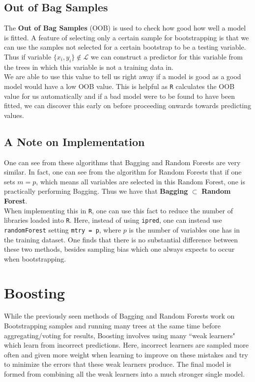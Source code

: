 \documentclass[11pt,a4paper]{report}
\begin{document}
\subsection{Out of Bag Samples}
The \textbf{Out of Bag Samples} (OOB) is used to check how good how well a model is fitted. 
A feature of selecting only a certain sample for bootstrapping is that we can use the samples not selected for a certain bootstrap to be a testing variable. 
Thus if variable $\{x_i, y_i\} \notin \mathcal{L}$ we can construct a predictor for this variable from the trees in which this variable is not a training data in.
\medskip\\
We are able to use this value to tell us right away if a model is good as a good model would have a low OOB value. 
This is helpful as {\color{blue} \texttt{R}} calculates the OOB value for us automatically and if a bad model were to be found to have been fitted, we can discover this early on before proceeding onwards towards predicting values.

\subsection{A Note on Implementation}
One can see from these algorithms that Bagging and Random Forests are very similar. 
In fact, one can see from the algorithm for Random Forests that if one sets $m = p$, which means all variables are selected in this Random Forest, one is practically performing Bagging.
Thus we have that \textbf{Bagging} $\subset$ \textbf{Random Forest}.
\medskip\\
When implementing this in {\color{blue} \texttt{R}}, one can use this fact to reduce the number of libraries loaded into {\color{blue} \texttt{R}}.
Here, instead of using {\color{blue} \texttt{ipred}}, one can instead use {\color{blue} \texttt{randomForest}} setting \texttt{mtry = p}, where $p$ is the number of variables one has in the training dataset.
One finds that there is no substantial difference between these two methods, besides sampling bias which one always expects to occur when bootstrapping.



\section{Boosting}
While the previously seen methods of Bagging and Random Forests work on Bootstrapping samples and running many trees at the same time before aggregating/voting for results, Boosting involves using many ``weak learners" which learn from incorrect predictions. 
Here, incorrect learners are sampled more often and given more weight when learning to improve on these mistakes and try to minimize the errors that these weak learners produce.
The final model is formed from combining all the weak learners into a much stronger single model.
\end{document}
